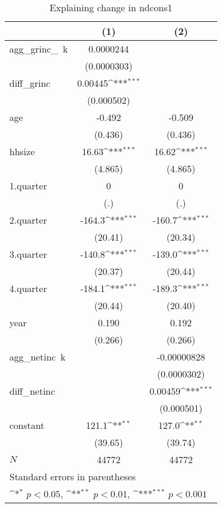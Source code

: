 \begin{table}[htbp]\centering
\def\sym#1{\ifmmode^{#1}\else\(^{#1}\)\fi}
\caption{\label{ndcons1\_deltainc} Explaining change in ndcons1}
\begin{tabular}{l*{2}{c}}
\hline\hline
            &\multicolumn{1}{c}{(1)}         &\multicolumn{1}{c}{(2)}         \\
\hline
agg\_grinc\_~k&   0.0000244         &                     \\
            & (0.0000303)         &                     \\
diff\_grinc  &     0.00445\sym{***}&                     \\
            &  (0.000502)         &                     \\
age         &      -0.492         &      -0.509         \\
            &     (0.436)         &     (0.436)         \\
hhsize      &       16.63\sym{***}&       16.62\sym{***}\\
            &     (4.865)         &     (4.865)         \\
1.quarter   &           0         &           0         \\
            &         (.)         &         (.)         \\
2.quarter   &      -164.3\sym{***}&      -160.7\sym{***}\\
            &     (20.41)         &     (20.34)         \\
3.quarter   &      -140.8\sym{***}&      -139.0\sym{***}\\
            &     (20.37)         &     (20.44)         \\
4.quarter   &      -184.1\sym{***}&      -189.3\sym{***}\\
            &     (20.44)         &     (20.40)         \\
year        &       0.190         &       0.192         \\
            &     (0.266)         &     (0.266)         \\
agg\_netinc~k&                     & -0.00000828         \\
            &                     & (0.0000302)         \\
diff\_netinc &                     &     0.00459\sym{***}\\
            &                     &  (0.000501)         \\
constant    &       121.1\sym{**} &       127.0\sym{**} \\
            &     (39.65)         &     (39.74)         \\
\hline
\(N\)       &       44772         &       44772         \\
\hline\hline
\multicolumn{3}{l}{\footnotesize Standard errors in parentheses}\\
\multicolumn{3}{l}{\footnotesize \sym{*} \(p<0.05\), \sym{**} \(p<0.01\), \sym{***} \(p<0.001\)}\\
\end{tabular}
\end{table}
